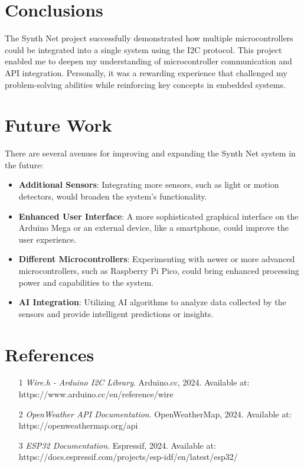 \documentclass[a4paper,12pt]{report}
\begin{document}
    \newpage
    
    \chapter{Conclusions}
    The Synth Net project successfully demonstrated how multiple microcontrollers could be integrated into a single system using the I2C protocol. This project enabled me to deepen my understanding of microcontroller communication and API integration. Personally, it was a rewarding experience that challenged my problem-solving abilities while reinforcing key concepts in embedded systems.
    
    \newpage
    
    \chapter{Future Work}
    There are several avenues for improving and expanding the Synth Net system in the future:
    
    \begin{itemize}
        \item \textbf{Additional Sensors}: Integrating more sensors, such as light or motion detectors, would broaden the system's functionality.
        \item \textbf{Enhanced User Interface}: A more sophisticated graphical interface on the Arduino Mega or an external device, like a smartphone, could improve the user experience.
        \item \textbf{Different Microcontrollers}: Experimenting with newer or more advanced microcontrollers, such as Raspberry Pi Pico, could bring enhanced processing power and capabilities to the system.
        \item \textbf{AI Integration}: Utilizing AI algorithms to analyze data collected by the sensors and provide intelligent predictions or insights.
    \end{itemize}
    
    \newpage
    
    \chapter{References}
    \begin{itemize}
        \item [1] \textit{Wire.h - Arduino I2C Library}. Arduino.cc, 2024. Available at: https://www.arduino.cc/en/reference/wire
        \item [2] \textit{OpenWeather API Documentation}. OpenWeatherMap, 2024. Available at: https://openweathermap.org/api
        \item [3] \textit{ESP32 Documentation}. Espressif, 2024. Available at: https://docs.espressif.com/projects/esp-idf/en/latest/esp32/
    \end{itemize}
    
\end{document}
